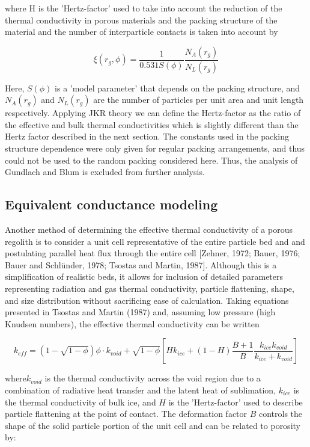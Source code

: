 \documentclass[11pt]{article} %
\begin{document}
	where H is the 'Hertz-factor' used to take into account the reduction of the thermal conductivity in porous materials and the packing structure of the material and the number of interparticle contacts is taken into account by

	\begin{equation}
	\xi(r_{g}, \phi) = \frac{1}{0.531 S(\phi)} \frac{N_{A}(r_{g})}{N_{L}(r_{g})}
	\end{equation}

	Here, $S(\phi)$ is a 'model parameter' that depends on the packing structure, and $N_{A}(r_{g})$ and $N_{L}(r_{g})$ are the number of particles per unit area and unit length respectively. Applying JKR theory we can define the Hertz-factor as the ratio of the effective and bulk thermal conductivities which is slightly different than the Hertz factor described in the next section. The constants used in the packing structure dependence were only given for regular packing arrangements, and thus could not be used to the random packing considered here. Thus, the analysis of Gundlach and Blum is excluded from further analysis. 
	
\subsection{Equivalent conductance modeling}

	Another method of determining the effective thermal conductivity of a porous regolith is to consider a unit cell representative of the entire particle bed and and postulating parallel heat flux through the entire cell [Zehner, 1972; Bauer, 1976; Bauer and Schl\"{u}nder, 1978; Tsostas and Martin, 1987]. Although this is a simplification of realistic beds, it allows for inclusion of detailed parameters representing radiation and gas thermal conductivity, particle flattening, shape, and size distribution without sacrificing ease of calculation. Taking equations presented in Tsostas and Martin (1987) and, assuming low pressure (high Knudsen numbers), the effective thermal conductivity can be written

	\begin{equation}
	k_{eff} = \left(1-\sqrt{1-\phi} \right)\phi \cdot k_{void} + \sqrt{1-\phi}\left[ H k_{ice}+(1 - H)\frac{B+1}{B}\frac{k_{ice}k_{void}}{k_{ice}+k_{void}} \right]
	\end{equation}
	
	where$k_{void}$ is the thermal conductivity across the void region due to a combination of radiative heat transfer and the latent heat of sublimation, $k_{ice}$ is the thermal conductivity of bulk ice, and $H$ is the 'Hertz-factor' used to describe particle flattening at the point of contact. The deformation factor $B$ controls the shape of the solid particle portion of the unit cell and can be related to porosity by:
	
\end{document}
